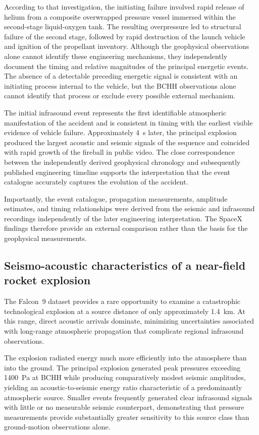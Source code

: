 \documentclass[]{seismica}
\begin{document}
According to that investigation, the initiating failure involved rapid release
of helium from a composite overwrapped pressure vessel immersed within the
second-stage liquid-oxygen tank. The resulting overpressure led to structural
failure of the second stage, followed by rapid destruction of the launch
vehicle and ignition of the propellant inventory. Although the geophysical
observations alone cannot identify these engineering mechanisms, they
independently document the timing and relative magnitudes of the principal
energetic events. The absence of a detectable preceding energetic signal is
consistent with an initiating process internal to the vehicle, but the BCHH
observations alone cannot identify that process or exclude every possible
external mechanism.

The initial infrasound event represents the first identifiable atmospheric manifestation of the accident and is consistent in timing with the earliest visible evidence of vehicle failure. Approximately 4~s later, the principal explosion produced the largest acoustic and seismic signals of the sequence and coincided with rapid growth of the fireball in public video. The close correspondence between the independently derived geophysical chronology and subsequently published engineering timeline supports the interpretation that the event catalogue accurately captures the evolution of the accident.

Importantly, the event catalogue, propagation measurements, amplitude estimates, and timing relationships were derived from the seismic and infrasound recordings independently of the later engineering interpretation. The SpaceX findings therefore provide an external comparison rather than the basis for the geophysical measurements.

\subsection{Seismo-acoustic characteristics of a near-field rocket explosion}
\label{sec:discussion_characteristics}

The Falcon~9 dataset provides a rare opportunity to examine a catastrophic technological explosion at a source distance of only approximately 1.4~km. At this range, direct acoustic arrivals dominate, minimizing uncertainties associated with long-range atmospheric propagation that complicate regional infrasound observations.

The explosion radiated energy much more efficiently into the atmosphere than into the ground. The principal explosion generated peak pressures exceeding 1400~Pa at BCHH while producing comparatively modest seismic amplitudes, yielding an acoustic-to-seismic energy ratio characteristic of a predominantly atmospheric source. Smaller events frequently generated clear infrasound signals with little or no measurable seismic counterpart, demonstrating that pressure measurements provide substantially greater sensitivity to this source class than ground-motion observations alone.
\end{document}
